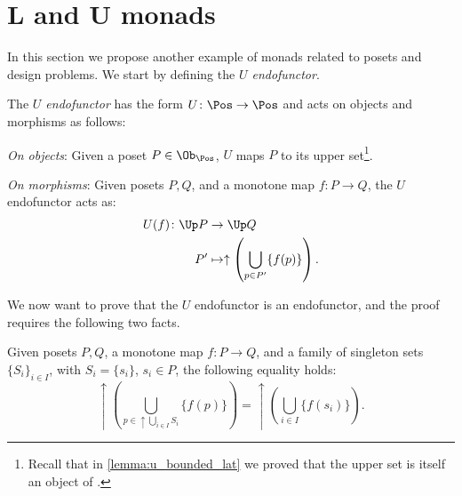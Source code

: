 \section{L and U monads}
In this section we propose another example of monads related to posets and design problems. We start by defining the \emph{$U$ endofunctor}.
\begin{definition}[$U$ endofunctor]
    \label{def:ufunctor}
    The \emph{$U$ endofunctor} has the form $U\colon \Pos \to \Pos$ and acts on objects and morphisms as follows:
    \begin{compactenum}
        \item \emph{On objects}: Given a poset $P\in \Ob_\Pos$, $U$ maps $P$ to its upper set\footnote{Recall that in \cref{lemma:u_bounded_lat} we proved that the upper set is itself an object of \Pos.}.
        \item \emph{On morphisms}: Given posets $P,Q$, and a monotone map $f\colon P\to Q$, the $U$ endofunctor acts as:
        \begin{equation}
            \begin{aligned}
                U(f)\colon \Up P&\to \Up Q\\
                P'&\mapsto \uparrow \left( \bigcup_{p\in P'} \{f(p)\}\right).
            \end{aligned}
        \end{equation}
    \end{compactenum}
\end{definition}
We now want to prove that the $U$ endofunctor is an endofunctor, and the proof requires the following two facts.
\begin{lemma}
    \label{lemma:unpack_u_functor}
    Given posets $P,Q$, a monotone map $f\colon P \to Q$, and a family of singleton sets $\{S_i\}_{i\in I}$, with $S_i=\{s_i\}$, $s_i\in P$, the following equality holds:
    \begin{equation}
        \label{eq:lemma_unpack}
        \uparrow\left( \bigcup_{p\in \uparrow \bigcup_{i\in I}S_i}\{f(p)\}\right)= \uparrow \left( \bigcup_{i\in I} \{f(s_i)\}\right).
    \end{equation}
\end{lemma}
